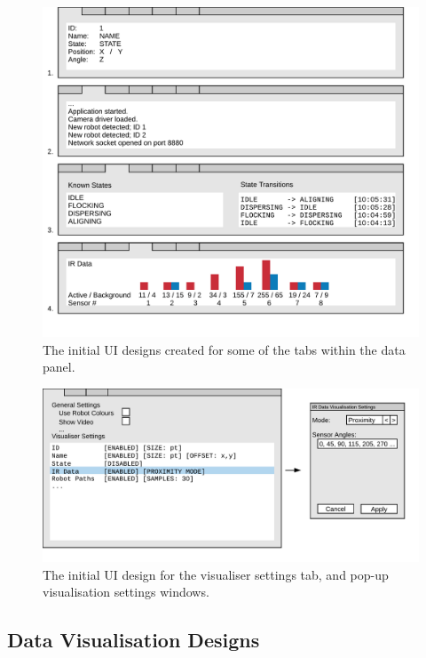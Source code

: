 \begin{figure}
	\centering
	\includegraphics[scale=1]{Figures/DataPanelDesigns.png}
	\decoRule
	\caption[Data Panel Designs]{The initial UI designs created for some of the tabs within the data panel.}
	\label{fig:DataPanelDesigns}
\end{figure}

\begin{figure}
	\centering
	\includegraphics[scale=1]{Figures/VisualiserSettingsTabDesign.png}
	\decoRule
	\caption[Visualiser Settings Tab Design]{The initial UI design for the visualiser settings tab, and pop-up visualisation settings windows.}
	\label{fig:VisualiserSettingsTabDesign}
\end{figure}

\subsection{Data Visualisation Designs} \label{DataVisualisationDesigns}

